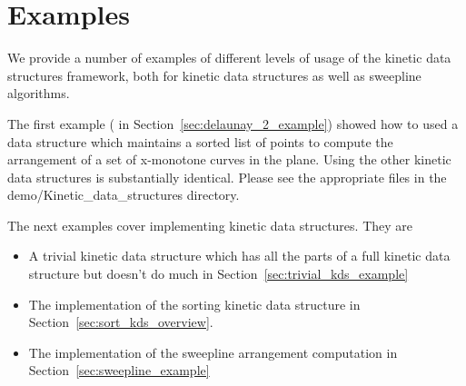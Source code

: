 \section{Examples}
\label{sec:examples}

We provide a number of examples of different levels of usage of the
kinetic data structures framework, both for kinetic data structures as
well as sweepline algorithms.

The first example ( in Section~\ref{sec:delaunay_2_example}) showed
how to used a data structure which maintains a sorted list of points
to compute the arrangement of a set of x-monotone curves in the
plane. Using the other kinetic data structures is substantially
identical. Please see the appropriate files in the
demo/Kinetic\_data\_structures directory.

The next examples cover implementing kinetic data structures. They are
\begin{itemize}
\item A trivial kinetic data structure which has all the parts of a
full kinetic data structure but doesn't do much in
Section~\ref{sec:trivial_kds_example}
\item The implementation of the sorting kinetic data structure in
Section~\ref{sec:sort_kds_overview}.
\item The implementation of the sweepline arrangement computation in
  Section~\ref{sec:sweepline_example}
\end{itemize}






